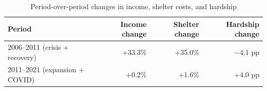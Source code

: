 \begin{table}[htbp]
\centering
\caption{Period-over-period changes in income, shelter costs, and hardship}
\label{tab:periods}
\small
\begin{tabular}{lrrr}
\toprule
Period & Income change & Shelter change & Hardship change \\
\midrule
2006--2011 (crisis + recovery) & +33.3\% & +35.0\% & $-$4.1 pp \\
2011--2021 (expansion + COVID) & +0.2\% & +1.6\% & +4.0 pp \\
\bottomrule
\end{tabular}
\par{}
\end{table}
